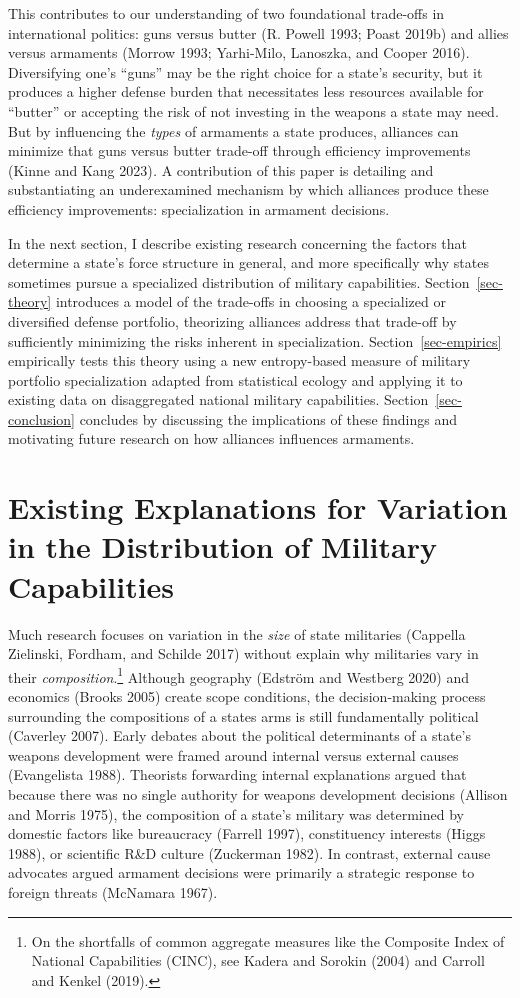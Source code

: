 \documentclass[
  12,
  letterpaper,
  DIV=11,
  numbers=noendperiod]{scrartcl}
\begin{document}
This contributes to our understanding of two foundational trade-offs in
international politics: guns versus butter (R. Powell 1993; Poast 2019b)
and allies versus armaments (Morrow 1993; Yarhi-Milo, Lanoszka, and
Cooper 2016). Diversifying one's ``guns'' may be the right choice for a
state's security, but it produces a higher defense burden that
necessitates less resources available for ``butter'' or accepting the
risk of not investing in the weapons a state may need. But by
influencing the \emph{types} of armaments a state produces, alliances
can minimize that guns versus butter trade-off through efficiency
improvements (Kinne and Kang 2023)\emph{.} A contribution of this paper
is detailing and substantiating an underexamined mechanism by which
alliances produce these efficiency improvements: specialization in
armament decisions.

In the next section, I describe existing research concerning the factors
that determine a state's force structure in general, and more
specifically why states sometimes pursue a specialized distribution of
military capabilities. Section~\ref{sec-theory} introduces a model of
the trade-offs in choosing a specialized or diversified defense
portfolio, theorizing alliances address that trade-off by sufficiently
minimizing the risks inherent in specialization.
Section~\ref{sec-empirics} empirically tests this theory using a new
entropy-based measure of military portfolio specialization adapted from
statistical ecology and applying it to existing data on disaggregated
national military capabilities. Section~\ref{sec-conclusion} concludes
by discussing the implications of these findings and motivating future
research on how alliances influences armaments.

\hypertarget{sec-lit}{%
\section{Existing Explanations for Variation in the Distribution of
Military Capabilities}\label{sec-lit}}

Much research focuses on variation in the \emph{size} of state
militaries (Cappella Zielinski, Fordham, and Schilde 2017) without
explain why militaries vary in their \emph{composition}.\footnote{On the
  shortfalls of common aggregate measures like the Composite Index of
  National Capabilities (CINC), see Kadera and Sorokin (2004) and
  Carroll and Kenkel (2019).} Although geography (Edström and Westberg
2020) and economics (Brooks 2005) create scope conditions, the
decision-making process surrounding the compositions of a states arms is
still fundamentally political (Caverley 2007). Early debates about the
political determinants of a state's weapons development were framed
around internal versus external causes (Evangelista 1988). Theorists
forwarding internal explanations argued that because there was no single
authority for weapons development decisions (Allison and Morris 1975),
the composition of a state's military was determined by domestic factors
like bureaucracy (Farrell 1997), constituency interests (Higgs 1988), or
scientific R\&D culture (Zuckerman 1982). In contrast, external cause
advocates argued armament decisions were primarily a strategic response
to foreign threats (McNamara 1967).
\end{document}
